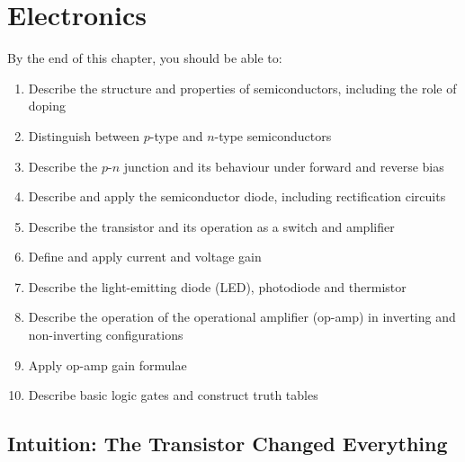 %

\chapter{Electronics}
\label{ch:electronics}
\minitoc
\newpage


\begin{objectivebox}
By the end of this chapter, you should be able to:
\begin{enumerate}[noitemsep]
  \item Describe the structure and properties of
  semiconductors, including the role of doping
  \item Distinguish between $p$-type and $n$-type
  semiconductors
  \item Describe the $p$-$n$ junction and its
  behaviour under forward and reverse bias
  \item Describe and apply the semiconductor diode,
  including rectification circuits
  \item Describe the transistor and its operation
  as a switch and amplifier
  \item Define and apply current and voltage gain
  \item Describe the light-emitting diode (LED),
  photodiode and thermistor
  \item Describe the operation of the operational
  amplifier (op-amp) in inverting and
  non-inverting configurations
  \item Apply op-amp gain formulae
  \item Describe basic logic gates and construct
  truth tables
\end{enumerate}
\end{objectivebox}

\section{Intuition: The Transistor Changed Everything}

